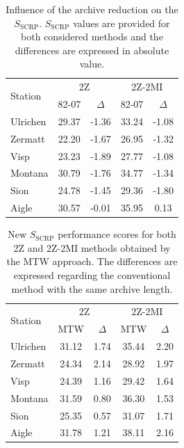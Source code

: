 \documentclass[hess, manuscript]{copernicus}
\begin{document}
\begin{table}[htb]
	\caption{Influence of the archive reduction on the $S_{\text{SCRP}}$. $S_{\text{SCRP}}$ values are provided for both considered methods and the differences are expressed in absolute value.}
	\begin{center}
		\begin{tabular}{l c c c c }
			\hline
			\multirow{2}{*}{Station} & \multicolumn{2}{c}{2Z} & \multicolumn{2}{c}{2Z-2MI} \\
			& 82-07 & $\Delta$ & 82-07 & $\Delta$ \\ 
			\hline
			Ulrichen & 29.37 & -1.36 & 33.24 & -1.08 \\
			Zermatt & 22.20 & -1.67 & 26.95 & -1.32 \\
			Visp & 23.23 & -1.89 & 27.77 & -1.08 \\
			Montana & 30.79 & -1.76 & 34.77 & -1.34 \\
			Sion & 24.78 & -1.45 & 29.36 & -1.80 \\
			Aigle & 30.57 & -0.01 & 35.95 & 0.13 \\ 
			\hline
		\end{tabular}
	\end{center}
	\label{table:loss_reduction}
\end{table}

\begin{table}[htb]
	\caption{New $S_{\text{SCRP}}$ performance scores for both 2Z and 2Z-2MI methods obtained by the MTW approach. The differences are expressed regarding the conventional method with the same archive length.}
	\begin{center}
		\begin{tabular}{l c c c c}
			\hline
			\multirow{2}{*}{Station} & \multicolumn{2}{c}{2Z} & \multicolumn{ 2}{c}{2Z-2MI} \\
			& MTW & $\Delta$ & MTW & $\Delta$ \\
			\hline
			Ulrichen & 31.12 & 1.74 & 35.44 & 2.20 \\
			Zermatt & 24.34 & 2.14 & 28.92 & 1.97 \\
			Visp & 24.39 & 1.16 & 29.42 & 1.64 \\
			Montana & 31.59 & 0.80 & 36.30 & 1.53 \\
			Sion & 25.35 & 0.57 & 31.07 & 1.71 \\
			Aigle & 31.78 & 1.21 & 38.11 & 2.16 \\ 
			\hline
		\end{tabular}
	\end{center}
	\label{table:CRPSS_MTW}
\end{table}
\end{document}
